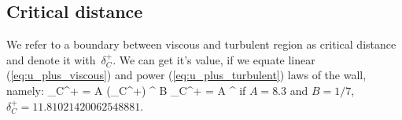 \documentclass{report}
\begin{document}
\subsection{Critical distance}

We refer to a boundary between viscous and turbulent region as critical 
distance and denote it with~$\delta_C^+$. We can get it's value, if we
equate linear (\ref{eq:u_plus_viscous}) and power (\ref{eq:u_plus_turbulent})
laws of the wall, namely:
%
\be
  \delta_C^+ = A (\delta_C^+) ^ B
\ee
%
\be
  \delta_C^+ = A ^ {}
\ee
%
if $A=8.3$ and $B=1/7$, $\delta_C^+ = 11.81021420062548881$.
\end{document}
